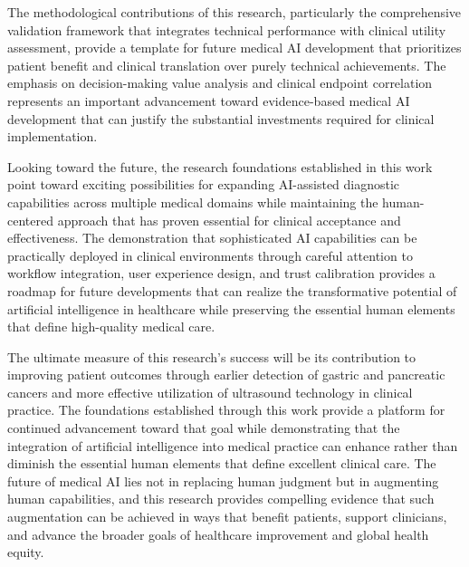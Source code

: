 The methodological contributions of this research, particularly the comprehensive validation framework that integrates technical performance with clinical utility assessment, provide a template for future medical AI development that prioritizes patient benefit and clinical translation over purely technical achievements. The emphasis on decision-making value analysis and clinical endpoint correlation represents an important advancement toward evidence-based medical AI development that can justify the substantial investments required for clinical implementation.

Looking toward the future, the research foundations established in this work point toward exciting possibilities for expanding AI-assisted diagnostic capabilities across multiple medical domains while maintaining the human-centered approach that has proven essential for clinical acceptance and effectiveness. The demonstration that sophisticated AI capabilities can be practically deployed in clinical environments through careful attention to workflow integration, user experience design, and trust calibration provides a roadmap for future developments that can realize the transformative potential of artificial intelligence in healthcare while preserving the essential human elements that define high-quality medical care.

The ultimate measure of this research's success will be its contribution to improving patient outcomes through earlier detection of gastric and pancreatic cancers and more effective utilization of ultrasound technology in clinical practice. The foundations established through this work provide a platform for continued advancement toward that goal while demonstrating that the integration of artificial intelligence into medical practice can enhance rather than diminish the essential human elements that define excellent clinical care. The future of medical AI lies not in replacing human judgment but in augmenting human capabilities, and this research provides compelling evidence that such augmentation can be achieved in ways that benefit patients, support clinicians, and advance the broader goals of healthcare improvement and global health equity. 